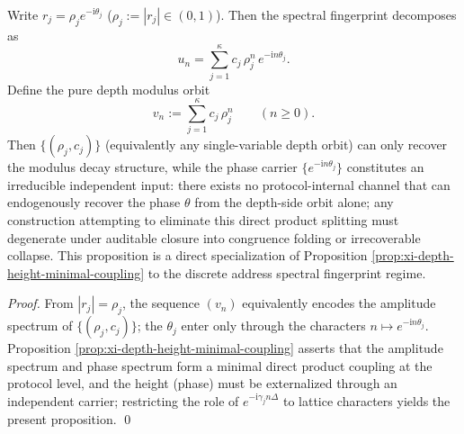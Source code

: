 \begin{proposition}\label{prop:xi-scan-depth-height-tensor-factorization}
Write \(r_j=\rho_j e^{-\mathrm{i}\theta_j}\) (\(\rho_j:=|r_j|\in(0,1)\)).
Then the spectral fingerprint decomposes as
\[
u_n=\sum_{j=1}^{\kappa}c_j\,\rho_j^{n}\,e^{-\mathrm{i}n\theta_j}.
\]
Define the pure depth modulus orbit
\[
v_n:=\sum_{j=1}^{\kappa}c_j\,\rho_j^{n}\qquad(n\ge 0).
\]
Then \(\{(\rho_j,c_j)\}\) (equivalently any single-variable depth orbit) can only recover the modulus decay structure, while the phase carrier \(\{e^{-\mathrm{i}n\theta_j}\}\) constitutes an irreducible independent input: there exists no protocol-internal channel that can endogenously recover the phase \(\theta\) from the depth-side orbit alone; any construction attempting to eliminate this direct product splitting must degenerate under auditable closure into congruence folding or irrecoverable collapse.
This proposition is a direct specialization of Proposition \ref{prop:xi-depth-height-minimal-coupling} to the discrete address spectral fingerprint regime.
\end{proposition}
\begin{proof}
From \(|r_j|=\rho_j\), the sequence \((v_n)\) equivalently encodes the amplitude spectrum of \(\{(\rho_j,c_j)\}\); the \(\theta_j\) enter only through the characters \(n\mapsto e^{-\mathrm{i}n\theta_j}\).
Proposition \ref{prop:xi-depth-height-minimal-coupling} asserts that the amplitude spectrum and phase spectrum form a minimal direct product coupling at the protocol level, and the height (phase) must be externalized through an independent carrier; restricting the role of \(e^{-\mathrm{i}\gamma_j n\Delta}\) to lattice characters yields the present proposition. \qed
\end{proof}

